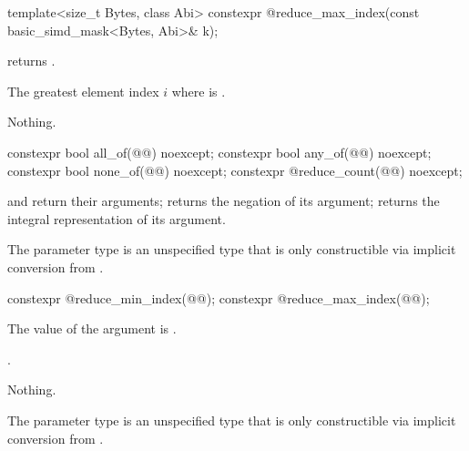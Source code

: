 \begin{itemdecl}
template<size_t Bytes, class Abi> constexpr @\simdsizetype@ reduce_max_index(const basic_simd_mask<Bytes, Abi>& k);
\end{itemdecl}

\begin{itemdescr}
  \pnum\expects
   returns .

  \pnum\returns
  The greatest element index $i$ where  is .

  \pnum\throws Nothing.
\end{itemdescr}

\begin{itemdecl}
constexpr bool all_of(@@) noexcept;
constexpr bool any_of(@@) noexcept;
constexpr bool none_of(@@) noexcept;
constexpr @\simdsizetype@ reduce_count(@@) noexcept;
\end{itemdecl}

\begin{itemdescr}
  \pnum\returns
   and  return their arguments;  returns the negation of its argument;  returns the integral representation of its argument.

  \pnum\remarks
  The parameter type  is an unspecified type that is only constructible via implicit conversion from .
\end{itemdescr}

\begin{itemdecl}
constexpr @\simdsizetype@ reduce_min_index(@@);
constexpr @\simdsizetype@ reduce_max_index(@@);
\end{itemdecl}

\begin{itemdescr}
  \pnum\expects
  The value of the argument is .

  \pnum\returns
  .

  \pnum\throws Nothing.

  \pnum\remarks
  The parameter type  is an unspecified type that is only constructible via implicit conversion from .
\end{itemdescr}

